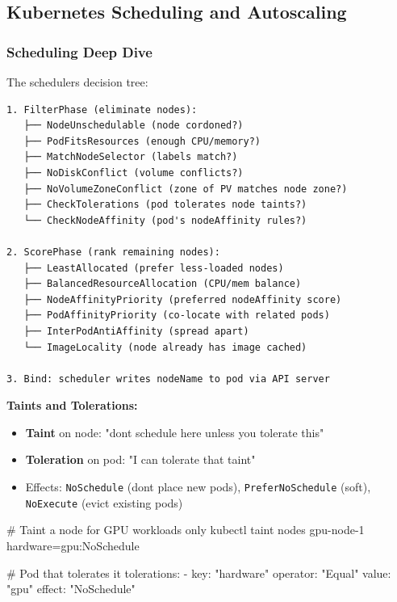 \documentclass[11pt]{article}
\providecommand{\tightlist}{\setlength{\itemsep}{1pt}\setlength{\parskip}{0pt}}
\newenvironment{Shaded}{\begin{snugshade}}{\end{snugshade}}
\newcommand{\CommentTok}[1]{\textcolor[rgb]{0.48,0.49,0.49}{#1}}
\newcommand{\DecValTok}[1]{\textcolor[rgb]{0.96,0.45,0.00}{#1}}
\newcommand{\NormalTok}[1]{\textcolor[rgb]{0.81,0.81,0.76}{#1}}
\newcommand{\OperatorTok}[1]{\textcolor[rgb]{0.81,0.81,0.76}{#1}}
\newcommand{\StringTok}[1]{\textcolor[rgb]{0.96,0.31,0.31}{#1}}
\begin{document}
\subsection{Kubernetes Scheduling and Autoscaling}\label{kubernetes-scheduling-and-autoscaling}

\subsubsection{Scheduling Deep Dive}\label{scheduling-deep-dive}

The scheduler\textquotesingle s decision tree:

\setcodelang{}

\begin{verbatim}
1. FilterPhase (eliminate nodes):
   ├── NodeUnschedulable (node cordoned?)
   ├── PodFitsResources (enough CPU/memory?)
   ├── MatchNodeSelector (labels match?)
   ├── NoDiskConflict (volume conflicts?)
   ├── NoVolumeZoneConflict (zone of PV matches node zone?)
   ├── CheckTolerations (pod tolerates node taints?)
   └── CheckNodeAffinity (pod's nodeAffinity rules?)

2. ScorePhase (rank remaining nodes):
   ├── LeastAllocated (prefer less-loaded nodes)
   ├── BalancedResourceAllocation (CPU/mem balance)
   ├── NodeAffinityPriority (preferred nodeAffinity score)
   ├── PodAffinityPriority (co-locate with related pods)
   ├── InterPodAntiAffinity (spread apart)
   └── ImageLocality (node already has image cached)

3. Bind: scheduler writes nodeName to pod via API server
\end{verbatim}

\textbf{Taints and Tolerations:}

\begin{itemize}
\tightlist
\item
  \textbf{Taint} on node: "don\textquotesingle t schedule here unless you tolerate this"
\item
  \textbf{Toleration} on pod: "I can tolerate that taint"
\item
  Effects: \texttt{NoSchedule} (don\textquotesingle t place new pods), \texttt{PreferNoSchedule} (soft), \texttt{NoExecute} (evict existing pods)
\end{itemize}


\begin{Shaded}
\begin{Highlighting}[]
\CommentTok{\# Taint a node for GPU workloads only}
\NormalTok{kubectl taint nodes gpu}\OperatorTok{{-}}\NormalTok{node}\OperatorTok{{-}}\DecValTok{1}\NormalTok{ hardware}\OperatorTok{=}\NormalTok{gpu:NoSchedule}

\CommentTok{\# Pod that tolerates it}
\NormalTok{tolerations:}
\OperatorTok{{-}}\NormalTok{ key: }\StringTok{"hardware"}
\NormalTok{  operator: }\StringTok{"Equal"}
\NormalTok{  value: }\StringTok{"gpu"}
\NormalTok{  effect: }\StringTok{"NoSchedule"}
\end{Highlighting}
\end{Shaded}
\end{document}
